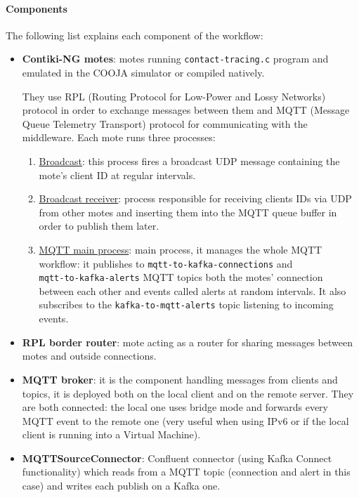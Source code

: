 \documentclass[table, 12pt]{article}
\begin{document}
\paragraph{Components}
The following list explains each component of the workflow:
\begin{itemize}
    \item \textbf{Contiki-NG motes}: motes running \texttt{contact-tracing.c} program and emulated in the COOJA simulator or compiled natively.

          They use RPL (Routing Protocol for Low-Power and Lossy Networks) protocol in order to exchange messages between them and MQTT (Message Queue Telemetry Transport) protocol for communicating with the middleware.
          Each mote runs three processes:
          \begin{enumerate}
              \item \underline{Broadcast}: this process fires a broadcast UDP message containing the mote's client ID at regular intervals.
              \item \underline{Broadcast receiver}: process responsible for receiving clients IDs via UDP from other motes and inserting them into the MQTT queue buffer in order to publish them later.
              \item \underline{MQTT main process}: main process, it manages the whole MQTT workflow: it publishes to \texttt{mqtt-to-kafka-connections} and \\ \texttt{mqtt-to-kafka-alerts} MQTT topics both the motes' connection between each other and events called alerts at random intervals. It also subscribes to the \texttt{kafka-to-mqtt-alerts} topic listening to incoming events.
          \end{enumerate}
    \item \textbf{RPL border router}: mote acting as a router for sharing messages between motes and outside connections.
    \item \textbf{MQTT broker}: it is the component handling messages from clients and topics, it is deployed both on the local client and on the remote server. They are both connected: the local one uses bridge mode and forwards every MQTT event to the remote one (very useful when using IPv6 or if the local client is running into a Virtual Machine).
    \item \textbf{MQTTSourceConnector}: Confluent connector (using Kafka Connect functionality) which reads from a MQTT topic (connection and alert in this case) and writes each publish on a Kafka one.

\end{itemize}
\end{document}
